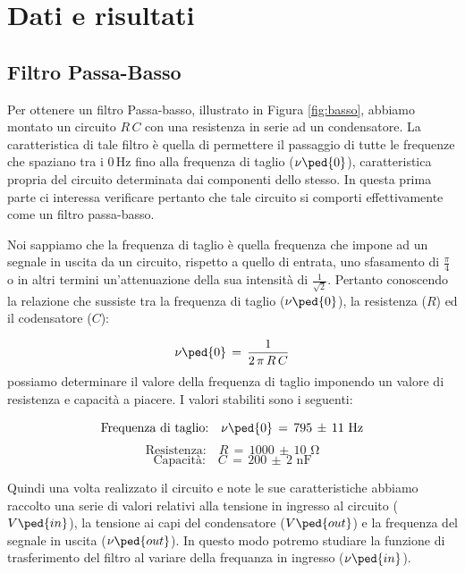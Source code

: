 \section*{Dati e risultati}

\subsection*{Filtro Passa-Basso}

Per ottenere un filtro Passa-basso, illustrato in Figura \ref{fig:basso}, abbiamo montato un circuito $R\,C$ con una resistenza in serie ad un condensatore.
La caratteristica di tale filtro è quella di permettere il passaggio di tutte le frequenze che spaziano tra i $0\,\si{\hertz}$ fino alla frequenza di taglio ($\nu\ped{0}$), caratteristica propria del circuito determinata dai componenti dello stesso.
In questa prima parte ci interessa verificare pertanto che tale circuito si comporti effettivamente come un filtro passa-basso.

Noi sappiamo che la frequenza di taglio è quella frequenza che impone ad un segnale in uscita da un circuito, rispetto a quello di entrata, uno sfasamento di $\frac{\pi}{4}$ o in altri termini un'attenuazione della sua intensità di $\frac{1}{\sqrt{2}}$.
Pertanto conoscendo la relazione che sussiste tra la frequenza di taglio ($\nu\ped{0}$), la resistenza ($R$) ed il codensatore ($C$):

\begin{equation}
	\nu\ped{0} \,=\, \frac{1}{2\,\pi\,R\,C}
	\label{eq:taglio basso}
\end{equation}
%
possiamo determinare il valore della frequenza di taglio imponendo un valore di resistenza e capacità a piacere. I valori stabiliti sono i seguenti:

\begin{equation*}
	\text{Frequenza di taglio:} \quad \nu\ped{0} \,=\, 795 \,\pm\, 11 \,\, \si{\hertz}
\end{equation*}
\begin{equation*}
	\text{Resistenza:} \quad R \,=\, 1000 \,\pm\, 10 \,\, \si{\ohm}
\end{equation*}
\begin{equation*}
	\text{Capacità:} \quad C \,=\, 200 \,\pm\, 2 \,\, \si{\nano\farad} 
\end{equation*}

Quindi una volta realizzato il circuito e note le sue caratteristiche abbiamo raccolto una serie di valori relativi alla tensione in ingresso al circuito ($V\ped{in}$), la tensione ai capi del condensatore ($V\ped{out}$) e la frequenza del segnale in uscita ($\nu\ped{out}$).
In questo modo potremo studiare la funzione di trasferimento del filtro al variare della frequanza in ingresso ($\nu\ped{in}$).

